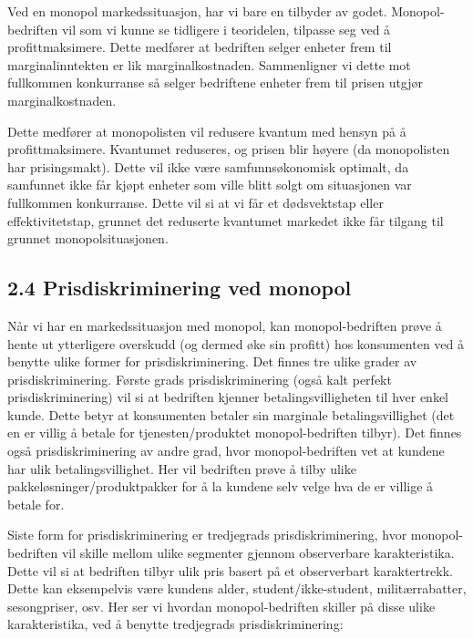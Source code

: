 \documentclass[
  12pt,
  a4paper,
  DIV=11,
  numbers=noendperiod]{scrartcl}
\begin{document}
Ved en monopol markedssituasjon, har vi bare en tilbyder av godet.
Monopol-bedriften vil som vi kunne se tidligere i teoridelen, tilpasse
seg ved å profittmaksimere. Dette medfører at bedriften selger enheter
frem til marginalinntekten er lik marginalkostnaden. Sammenligner vi
dette mot fullkommen konkurranse så selger bedriftene enheter frem til
prisen utgjør marginalkostnaden.

Dette medfører at monopolisten vil redusere kvantum med hensyn på å
profittmaksimere. Kvantumet reduseres, og prisen blir høyere (da
monopolisten har prisingsmakt). Dette vil ikke være samfunnsøkonomisk
optimalt, da samfunnet ikke får kjøpt enheter som ville blitt solgt om
situasjonen var fullkommen konkurranse. Dette vil si at vi får et
dødsvektstap eller effektivitetstap, grunnet det reduserte kvantumet
markedet ikke får tilgang til grunnet monopolsituasjonen.

\clearpage

\subsection{2.4 Prisdiskriminering ved
monopol}\label{prisdiskriminering-ved-monopol}

Når vi har en markedssituasjon med monopol, kan monopol-bedriften prøve
å hente ut ytterligere overskudd (og dermed øke sin profitt) hos
konsumenten ved å benytte ulike former for prisdiskriminering. Det
finnes tre ulike grader av prisdiskriminering. Første grads
prisdiskriminering (også kalt perfekt prisdiskriminering) vil si at
bedriften kjenner betalingsvilligheten til hver enkel kunde. Dette betyr
at konsumenten betaler sin marginale betalingsvillighet (det en er
villig å betale for tjenesten/produktet monopol-bedriften tilbyr). Det
finnes også prisdiskriminering av andre grad, hvor monopol-bedriften vet
at kundene har ulik betalingsvillighet. Her vil bedriften prøve å tilby
ulike pakkeløsninger/produktpakker for å la kundene selv velge hva de er
villige å betale for.

Siste form for prisdiskriminering er tredjegrads prisdiskriminering,
hvor monopol-bedriften vil skille mellom ulike segmenter gjennom
observerbare karakteristika. Dette vil si at bedriften tilbyr ulik pris
basert på et observerbart karaktertrekk. Dette kan eksempelvis være
kundens alder, student/ikke-student, militærrabatter, sesongpriser, osv.
Her ser vi hvordan monopol-bedriften skiller på disse ulike
karakteristika, ved å benytte tredjegrads prisdiskriminering:
\end{document}
